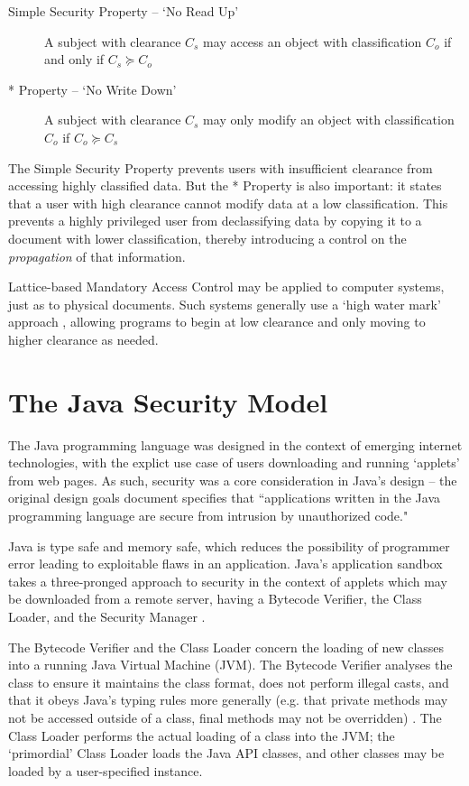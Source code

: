 \begin{description}
	\item[Simple Security Property -- `No Read Up'] A subject with clearance $ C_s $ may access an object with classification $ C_o $ if and only if $ C_s \succeq C_o $
	
	\item[* Property -- `No Write Down'] A subject with clearance $ C_s $ may only modify an object with classification $ C_o $ if $ C_o \succeq C_s $
\end{description}

The Simple Security Property prevents users with insufficient clearance from accessing highly classified data. But the * Property is also important: it states that a user with high clearance cannot modify data at a low classification. This prevents a highly privileged user from declassifying data by copying it to a document with lower classification, thereby introducing a control on the \textit{propagation} of that information.

Lattice-based Mandatory Access Control may be applied to computer systems, just as to physical documents. Such systems generally use a `high water mark' approach \cite{jones1975highwatermark}, allowing programs to begin at low clearance and only moving to higher clearance as needed.

\section{The Java Security Model}

The Java programming language was designed in the context of emerging internet technologies, with the explict use case of users downloading and running `applets' from web pages. As such, security was a core consideration in Java's design -- the original design goals document \cite{javadesignprinciples} specifies that ``applications written in the Java programming language are secure from intrusion by unauthorized code."

Java is type safe and memory safe, which reduces the possibility of programmer error leading to exploitable flaws in an application. Java's application sandbox takes a three-pronged approach to security in the context of applets which may be downloaded from a remote server, having a Bytecode Verifier, the Class Loader, and the Security Manager \cite{mcgraw1999securingjava}.

The Bytecode Verifier and the Class Loader concern the loading of new classes into a running Java Virtual Machine (JVM). The Bytecode Verifier analyses the class to ensure it maintains the class format, does not perform illegal casts, and that it obeys Java's typing rules more generally (e.g. that private methods may not be accessed outside of a class, final methods may not be overridden) \cite{lindholm2014java}. The Class Loader performs the actual loading of a class into the JVM; the `primordial' Class Loader \cite{mcgraw1999securingjava} loads the Java API classes, and other classes may be loaded by a user-specified  instance.

